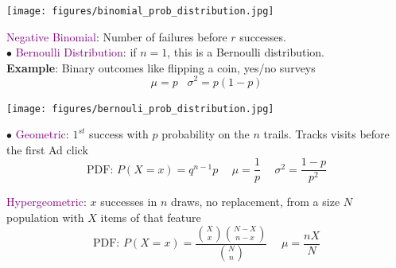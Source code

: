 \documentclass[letterpaper, 10.5pt,landscape]{article}
\begin{document}
\begin{multicols*}{3}
\vspace{-4pt}
\begin{center}
    \begin{minipage}{0.5\linewidth}
    \texttt{[image: figures/binomial\_prob\_distribution.jpg]}
    \end{minipage}
\end{center}
\vspace{-4pt}


\textcolor{purple}{Negative Binomial}:  
Number of failures before $r$ successes. \\

\vspace{3pt}
$\bullet$ \textcolor{purple}{Bernoulli Distribution}:  if $n=1$, this is a Bernoulli distribution. \\
\textbf{Example}: Binary outcomes like flipping a coin, yes/no surveys
\[\boxed{\mu = p} \hspace{10pt} \boxed{\sigma^{2} = p(1-p)}\]

\vspace{-4pt}
\begin{center}
    \begin{minipage}{0.5\linewidth}
    \texttt{[image: figures/bernouli\_prob\_distribution.jpg]}
    \end{minipage}
\end{center}
\vspace{-4pt}

\vspace{3pt}


\vspace{3pt}
$\bullet$ \textcolor{purple}{Geometric}: 
$1^{st}$ success with $p$ probability on the $n$ trails. Tracks visits before the first Ad click
\vspace{-3pt}
\[\boxed{\text{PDF: } P(X=x) = q^{n-1}p} \hspace{15pt} \boxed{\mu = \frac{1}{p}} \hspace{15pt} \boxed{\sigma^{2} = \frac{1-p}{p^2}} \]

\textcolor{purple}{Hypergeometric}: 
$x$ successes in $n$ draws, no replacement, from a size $N$ population with $X$ items of that feature
\vspace{-3pt}
\[\boxed{\text{PDF: } P(X=x) = \frac{ \binom{X}{x} \binom{N-X}{n-x}} {{\binom{N}{n}}}} \hspace{15pt} \boxed{\mu = \frac{nX}{N}} \]








\end{multicols*}
\end{document}
